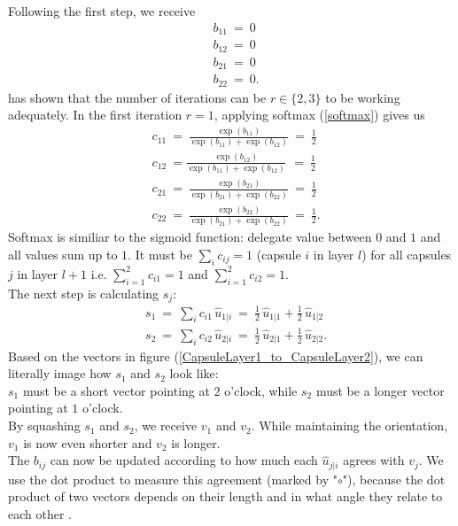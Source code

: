 \documentclass{article}
\begin{document}
{Following the first step, we receive
\begin{align*}
& b_{11} \ = \ 0 \\
& b_{12} \ = \ 0 \\
& b_{21} \ = \ 0 \\
& b_{22} \ = \ 0.
\end{align*}
\cite{hinton17} has shown that the number of iterations can be $r \in \{ 2, 3 \}$ to be working adequately.
In the first iteration $r=1$, applying softmax (\ref{softmax})\cite{wiki_softmax} gives us
\begin{align*}
& c_{11} \ = \ \frac{\exp(b_{11})}{\exp(b_{11}) + \exp(b_{12})} \ = \ \frac{1}{2} \\
& c_{12} \ = \frac{\exp(b_{12})}{\exp(b_{11}) + \exp(b_{12})} \ \, = \ \frac{1}{2} \\
& c_{21} \ = \ \frac{\exp(b_{21})}{\exp(b_{21}) + \exp(b_{22})} \ = \ \frac{1}{2} \\
& c_{22} \ = \ \frac{\exp(b_{22})}{\exp(b_{21}) + \exp(b_{22})} \ = \ \frac{1}{2}.
\end{align*}
Softmax is similiar to the sigmoid function: delegate value between $0$ and $1$ and all values sum up to $1$.  
It must be $\sum_i c_{ij} = 1$ (capsule $i$ in layer $l$) for all capsules $j$ in layer $l+1$ i.e. $\sum_{i=1}^2 c_{i1} =1$ and $\sum_{i=1}^2 c_{i2} =1$.\\
The next step is calculating $s_j$:
\begin{align} 
& s_1 \ = \ \sum_i c_{i1} \, \hat{u}_{1|i} \ = \ \frac{1}{2} \, \hat{u}_{1|1} + \frac{1}{2} \, \hat{u}_{1|2} \label{calculating_s1}\\
& s_2 \ = \ \sum_i c_{i2} \, \hat{u}_{2|i} \ = \ \frac{1}{2} \, \hat{u}_{2|1} + \frac{1}{2} \, \hat{u}_{2|2}. \label{calculating_s2}
\end{align}
Based on the vectors in figure (\ref{CapsuleLayer1_to_CapsuleLayer2}), we can literally image how $s_1$ and $s_2$ look like:\\
$s_1$ must be a short vector pointing at $2$ o'clock, while $s_2$ must be a longer vector pointing at $1$ o'clock.\\
By squashing $s_1$ and $s_2$, we receive $v_1$ and $v_2$. While maintaining the orientation, $v_1$ is now even shorter and $v_2$ is longer.\\
The $b_{ij}$ can now be updated according to how much each $\hat{u}_{j|i}$ agrees with $v_j$. We use the dot product to measure this agreement (marked by "$\circ$"), because the dot product of two vectors depends on their length and in what angle they relate to each other \cite{wiki:dotproduct}.
}
\end{document}
